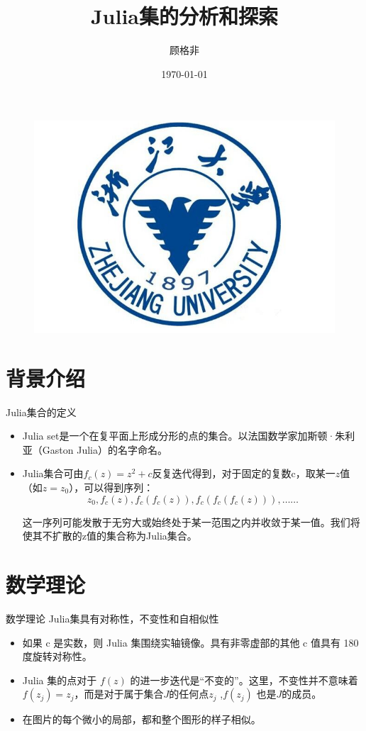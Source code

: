 \documentclass{beamer}
\author{顾格非}
\title{Julia集的分析和探索}
\institute{浙江大学数学科学学院}
\date{\today}
\begin{document}
\kaishu
\begin{frame}
    \titlepage
    \begin{figure}[htpb]
        \begin{center}
            \includegraphics[width=0.3\linewidth]{logo.jpeg}
        \end{center}
    \end{figure}
\end{frame}

\begin{frame}
    \tableofcontents[sectionstyle=show,subsectionstyle=show/shaded/hide,subsubsectionstyle=show/shaded/hide]
\end{frame}


\section{背景介绍}
\begin{frame}{Julia集合的定义}
    \begin{itemize}
        \item Julia set是一个在复平面上形成分形的点的集合。以法国数学家加斯顿·朱利亚（Gaston Julia）的名字命名。
        \item Julia集合可由$f_c(z)=z^2+c$反复迭代得到，对于固定的复数c，取某一$z$值（如$z=z_0$），可以得到序列：
$$
z_0,f_c(z),f_c(f_c(z)),f_c(f_c(f_c(z))),……
$$

这一序列可能发散于无穷大或始终处于某一范围之内并收敛于某一值。我们将使其不扩散的z值的集合称为Julia集合。
    \end{itemize}
    
\end{frame}


\section{数学理论}
\begin{frame}{数学理论}
    Julia集具有对称性，不变性和自相似性
    \begin{itemize}
        \item 如果 c 是实数，则 Julia 集围绕实轴镜像。具有非零虚部的其他 c 值具有 180 度旋转对称性。
        \item Julia 集的点对于 $f(z)$ 的进一步迭代是“不变的”。这里，不变性并不意味着 $f(z_j )=z_j$，而是对于属于集合$J$的任何点$z_j$ ,$f(z_j)$ 也是$J$的成员。
        \item 在图片的每个微小的局部，都和整个图形的样子相似。
    \end{itemize}
\end{frame}
\end{document}
